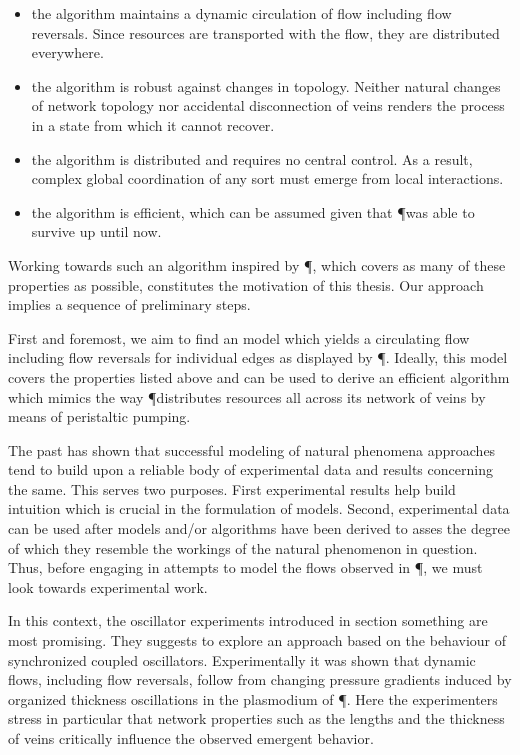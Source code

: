 	\begin{itemize}
		\item the algorithm maintains a dynamic circulation of flow including flow reversals. Since resources are transported with the flow, they are distributed everywhere.
		\item the algorithm is robust against changes in topology. Neither natural changes of network topology nor accidental disconnection of veins renders the process in a state from which it cannot recover.
		\item the algorithm is distributed and requires no central control. As a result, complex global coordination of any sort must emerge from local interactions.
		\item the algorithm is efficient, which can be assumed given that \P was able to survive up until now.
	\end{itemize}

	Working towards such an algorithm inspired by \P, which covers as many of these properties as possible, constitutes the motivation of this thesis. Our approach implies a sequence of preliminary steps. 

	First and foremost, we aim to find an model which yields a circulating flow including flow reversals for individual edges as displayed by \P. Ideally, this model covers the properties listed above and can be used to derive an efficient algorithm which mimics the way \P distributes resources all across its network of veins by means of peristaltic pumping. 

	The past has shown that successful modeling of natural phenomena approaches tend to build upon a reliable body of experimental data and results concerning the same. This serves two purposes. First experimental results help build intuition which is crucial in the formulation of models. Second, experimental data can be used after models and/or algorithms have been derived to asses the degree of which they resemble the workings of the natural phenomenon in question. Thus, before engaging in attempts to model the flows observed in \P, we must look towards experimental work.

	In this context, the oscillator experiments introduced in section something are most promising. They suggests to explore an approach based on the behaviour of synchronized coupled oscillators. Experimentally it was shown that dynamic flows, including flow reversals, follow from changing pressure gradients induced by organized thickness oscillations in the plasmodium of \P. Here the experimenters stress in particular that network properties such as the lengths and the thickness of veins critically influence the observed emergent behavior. 

